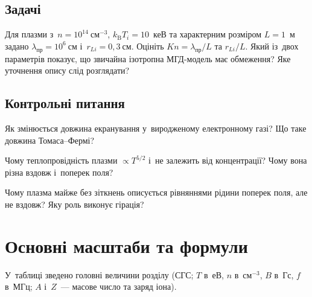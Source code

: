 

\section*{Задачі}



\begin{problem}\label{prb:PlasmaModelLimits}
Для плазми з~$n=10^{14}~\mathrm{см}^{-3}$, $k_{\mathrm B}T_i=10$~кеВ та характерним
розміром $L=1$~м задано $\lambda_{\mathrm{пр}}=10^6~\mathrm{см}$ і~$r_{Li}=0{,}3~\mathrm{см}$.
Оцініть $Kn=\lambda_{\mathrm{пр}}/L$ та $r_{Li}/L$. Який із~двох параметрів показує,
що звичайна ізотропна МГД-модель має обмеження? Яке уточнення опису слід розглядати?
\end{problem}

\section*{Контрольні питання}

\begin{Questions}
\begin{quizlist}
\item Як змінюється довжина екранування у~виродженому електронному газі? Що таке
		  довжина Томаса--Фермі?

\item Чому теплопровідність плазми $\propto T^{5/2}$ і~не залежить від
		  концентрації? Чому вона різна вздовж і~поперек поля?

\item Чому плазма майже без зіткнень описується рівняннями рідини поперек поля,
		  але не вздовж? Яку роль виконує гірація?

\end{quizlist}
\end{Questions}

\chapter{Основні масштаби та формули}\label{sec:plasma-formulas}\hypertarget{plasma-formulas}{}

У~таблиці зведено головні величини розділу (СГС; $T$ в~еВ, $n$ в~$\mathrm{см}^{-3}$, $B$
в~Гс, $f$ в~МГц; $A$ і~$Z$~--- масове число та заряд іона).

